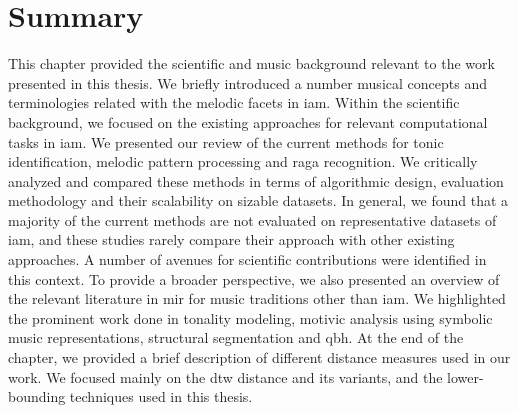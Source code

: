 \section{Summary}
\label{sec:background_summary}

This chapter provided the scientific and music background relevant to the work presented in this thesis. We briefly introduced a number musical concepts and terminologies related with the melodic facets in \gls{iam}. Within the scientific background, we focused on the existing approaches for relevant computational tasks in \gls{iam}. We presented our review of the current methods for tonic identification, melodic pattern processing and \gls{raga} recognition. We critically analyzed and compared these methods in terms of algorithmic design, evaluation methodology and their scalability on sizable datasets. In general, we found that a majority of the current methods are not evaluated on representative datasets of \gls{iam}, and these studies rarely compare their approach with other existing approaches. A number of avenues for scientific contributions were identified in this context. To provide a broader perspective, we also presented an overview of the relevant literature in \gls{mir} for music traditions other than \gls{iam}. We highlighted the prominent work done in tonality modeling, motivic analysis using symbolic music representations, structural segmentation and \gls{qbh}. At the end of the chapter, we provided a brief description of different distance measures used in our work. We focused mainly on the \gls{dtw} distance and its variants, and the lower-bounding techniques used in this thesis.
 
